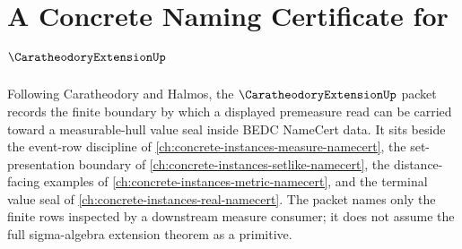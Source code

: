 \chapter{A Concrete Naming Certificate for $\CaratheodoryExtensionUp$}
\label{ch:concrete-instances-caratheodory-extension-namecert}

Following Caratheodory and Halmos, the $\CaratheodoryExtensionUp$ packet records the finite boundary by which a displayed premeasure read can be carried toward a measurable-hull value seal inside BEDC NameCert data. It sits beside the event-row discipline of \autoref{ch:concrete-instances-measure-namecert}, the set-presentation boundary of \autoref{ch:concrete-instances-setlike-namecert}, the distance-facing examples of \autoref{ch:concrete-instances-metric-namecert}, and the terminal value seal of \autoref{ch:concrete-instances-real-namecert}. The packet names only the finite rows inspected by a downstream measure consumer; it does not assume the full sigma-algebra extension theorem as a primitive.

